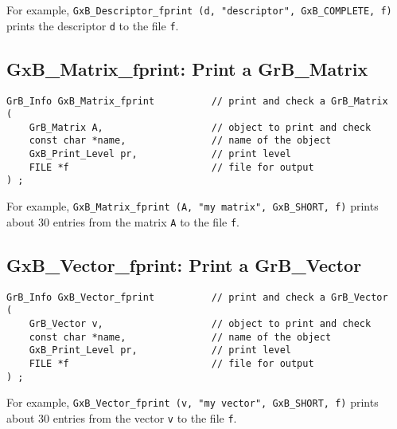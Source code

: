 \documentclass[12pt]{article}
\begin{document}
{For example,
\verb'GxB_Descriptor_fprint (d, "descriptor", GxB_COMPLETE, f)'
prints the descriptor \verb'd' to the file \verb'f'.

\newpage
\subsection{{\sf GxB\_Matrix\_fprint:} Print a {\sf GrB\_Matrix}}

\begin{mdframed}[userdefinedwidth=6in]
{\footnotesize
\begin{verbatim}
GrB_Info GxB_Matrix_fprint          // print and check a GrB_Matrix
(
    GrB_Matrix A,                   // object to print and check
    const char *name,               // name of the object
    GxB_Print_Level pr,             // print level
    FILE *f                         // file for output
) ;
\end{verbatim} } \end{mdframed}

For example, \verb'GxB_Matrix_fprint (A, "my matrix", GxB_SHORT, f)'
prints about 30 entries from the matrix \verb'A' to the file \verb'f'.


\subsection{{\sf GxB\_Vector\_fprint:} Print a {\sf GrB\_Vector}}

\begin{mdframed}[userdefinedwidth=6in]
{\footnotesize
\begin{verbatim}
GrB_Info GxB_Vector_fprint          // print and check a GrB_Vector
(
    GrB_Vector v,                   // object to print and check
    const char *name,               // name of the object
    GxB_Print_Level pr,             // print level
    FILE *f                         // file for output
) ;
\end{verbatim} } \end{mdframed}

For example, \verb'GxB_Vector_fprint (v, "my vector", GxB_SHORT, f)'
prints about 30 entries from the vector \verb'v' to the file \verb'f'.

}
\end{document}
